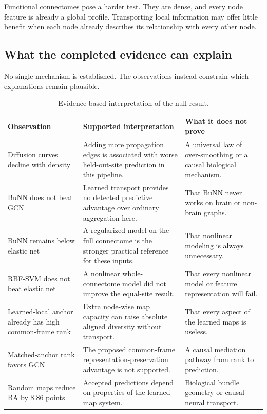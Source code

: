 \documentclass[11pt,a4paper]{article}
\begin{document}
Functional connectomes pose a harder test. They are dense, and every node
feature is already a global profile. Transporting local information may offer
little benefit when each node already describes its relationship with every
other node.

\subsection{What the completed evidence can explain}

No single mechanism is established. The observations instead constrain which
explanations remain plausible.

\begin{table}[htbp]
\centering
\caption{Evidence-based interpretation of the null result.}
\label{tab:explanation}
\small
\begin{tabularx}{\textwidth}{@{}p{3.1cm}Y Y@{}}
\toprule
\textbf{Observation} & \textbf{Supported interpretation} & \textbf{What it does not prove} \\
\midrule
Diffusion curves decline with density & Adding more propagation edges is associated with worse held-out-site prediction in this pipeline. & A universal law of over-smoothing or a causal biological mechanism. \\
BuNN does not beat GCN & Learned transport provides no detected predictive advantage over ordinary aggregation here. & That BuNN never works on brain or non-brain graphs. \\
BuNN remains below elastic net & A regularized model on the full connectome is the stronger practical reference for these inputs. & That nonlinear modeling is always unnecessary. \\
RBF-SVM does not beat elastic net & A nonlinear whole-connectome model did not improve the equal-site result. & That every nonlinear model or feature representation will fail. \\
Learned-local anchor already has high common-frame rank & Extra node-wise map capacity can raise absolute aligned diversity without transport. & That every aspect of the learned maps is useless. \\
Matched-anchor rank favors GCN & The proposed common-frame representation-preservation advantage is not supported. & A causal mediation pathway from rank to prediction. \\
Random maps reduce BA by 8.86 points & Accepted predictions depend on properties of the learned map system. & Biological bundle geometry or causal neural transport. \\

\end{tabularx}
\end{table}
\end{document}
